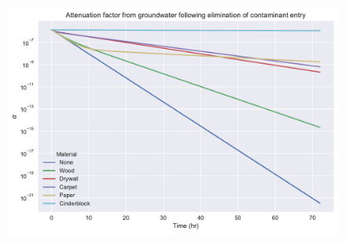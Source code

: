 \begin{figure}[!htb]
  \includegraphics[width=\textwidth]{sorption_mitigation.pdf}
  \caption{}
  \label{fig:sorption_mitigation}
\end{figure}
